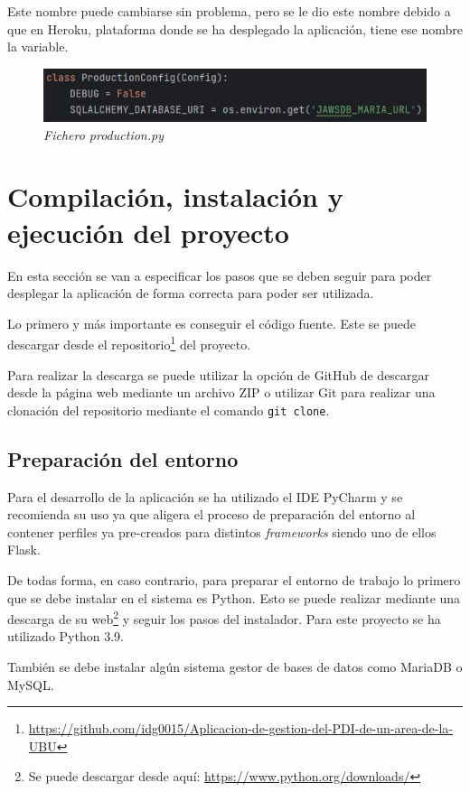 Este nombre puede cambiarse sin problema, pero se le dio este nombre debido a que en Heroku, plataforma donde se ha desplegado la aplicación, tiene ese nombre la variable.

\begin{figure}
	\centering
	\includegraphics[width=\textwidth]{../img/Anexos/ManualProgramador/production.png}
	\caption{\textit{Fichero production.py}}\label{fig:ficheroProd}
\end{figure}


\section{Compilación, instalación y ejecución del proyecto}
En esta sección se van a especificar los pasos que se deben seguir para poder desplegar la aplicación de forma correcta para poder ser utilizada.

Lo primero y más importante es conseguir el código fuente. 
Este se puede descargar desde el repositorio\footnote{\url{https://github.com/idg0015/Aplicacion-de-gestion-del-PDI-de-un-area-de-la-UBU}} del proyecto.

Para realizar la descarga se puede utilizar la opción de GitHub de descargar desde la página web mediante un archivo ZIP o utilizar Git para realizar una clonación del repositorio mediante el comando \texttt{git clone}.

\subsection{Preparación del entorno}
Para el desarrollo de la aplicación se ha utilizado el IDE PyCharm y se recomienda su uso ya que aligera el proceso de preparación del entorno al contener perfiles ya pre-creados para distintos \textit{frameworks} siendo uno de ellos Flask.

De todas forma, en caso contrario, para preparar el entorno de trabajo lo primero que se debe instalar en el sistema es Python.
Esto se puede realizar mediante una descarga de su web\footnote{Se puede descargar desde aquí: \url{https://www.python.org/downloads/}} y seguir los pasos del instalador. Para este proyecto se ha utilizado Python 3.9.

También se debe instalar algún sistema gestor de bases de datos como MariaDB o MySQL.

